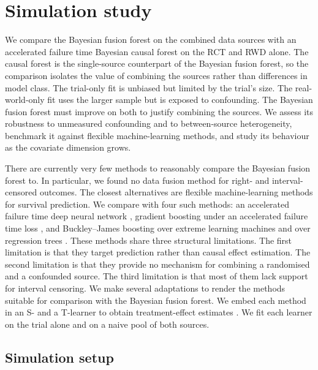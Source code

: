 \section{Simulation study}
We compare the Bayesian fusion forest on the combined data sources with an accelerated failure time Bayesian causal forest \citep{jacobs_software} on the RCT and RWD alone.
The causal forest is the single-source counterpart of the Bayesian fusion forest, so the comparison isolates the value of combining the sources rather than differences in model class.
The trial-only fit is unbiased but limited by the trial's size.
The real-world-only fit uses the larger sample but is exposed to confounding.
The Bayesian fusion forest must improve on both to justify combining the sources.
We assess its robustness to unmeasured confounding and to between-source heterogeneity, benchmark it against flexible machine-learning methods, and study its behaviour as the covariate dimension grows.

There are currently very few methods to reasonably compare the Bayesian fusion forest to.
In particular, we found no data fusion method for right- and interval-censored outcomes.
The closest alternatives are flexible machine-learning methods for survival prediction.
We compare with four such methods: an accelerated failure time deep neural network \citep{norman2024deepaft}, gradient boosting under an accelerated failure time loss \citep{barnwal2022xgboost}, and Buckley--James boosting over extreme learning machines and over regression trees \citep{kong2023bjelm}.
These methods share three structural limitations.
The first limitation is that they target prediction rather than causal effect estimation.
The second limitation is that they provide no mechanism for combining a randomised and a confounded source.
The third limitation is that most of them lack support for interval censoring.
We make several adaptations to render the methods suitable for comparison with the Bayesian fusion forest.
We embed each method in an S- and a T-learner to obtain treatment-effect estimates \citep{kunzel2019metalearners}.
We fit each learner on the trial alone and on a naive pool of both sources.


\subsection{Simulation setup}

